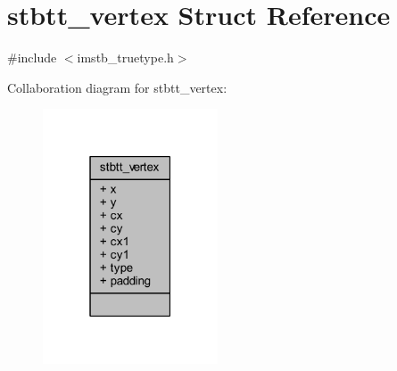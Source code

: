 \hypertarget{structstbtt__vertex}{}\section{stbtt\+\_\+vertex Struct Reference}
\label{structstbtt__vertex}


{\ttfamily \#include $<$imstb\+\_\+truetype.\+h$>$}



Collaboration diagram for stbtt\+\_\+vertex\+:
\nopagebreak
\begin{figure}[H]
\begin{center}
\leavevmode
\includegraphics[width=147pt]{structstbtt__vertex__coll__graph}
\end{center}
\end{figure}
